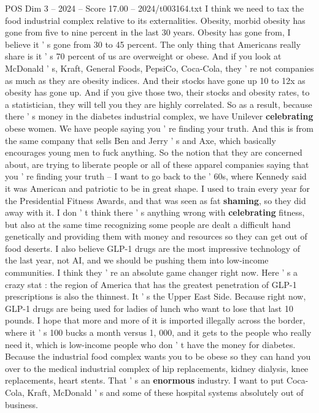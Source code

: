 \begin{textsample}{POS Dim 3 – 2024 – Score 17.00 – 2024/t003164.txt}
I think we need to tax the food industrial complex relative to its externalities.
Obesity, morbid obesity has gone from five to nine percent in the last 30 years.
Obesity has gone from, I believe it ' s gone from 30 to 45 percent.
The only thing that Americans really share is it ' s 70 percent of us are overweight or obese.
And if you look at McDonald ' s, Kraft, General Foods, PepsiCo, Coca-Cola, they ' re not companies as much as they are obesity indices.
And their stocks have gone up 10 to 12x as obesity has gone up.
And if you give those two, their stocks and obesity rates, to a statistician, they will tell you they are highly correlated.
So as a result, because there ' s money in the diabetes industrial complex, we have Unilever \textbf{celebrating} obese women.
We have people saying you ' re finding your truth.
And this is from the same company that sells Ben and Jerry ' s and Axe, which basically encourages young men to fuck anything.
So the notion that they are concerned about, are trying to liberate people or all of these apparel companies saying that you ' re finding your truth -- I want to go back to the ' 60s, where Kennedy said it was American and patriotic to be in great shape.
I used to train every year for the Presidential Fitness Awards, and that was seen as fat \textbf{shaming}, so they did away with it.
I don ' t think there ' s anything wrong with \textbf{celebrating} fitness, but also at the same time recognizing some people are dealt a difficult hand genetically and providing them with money and resources so they can get out of food deserts.
I also believe GLP-1 drugs are the most impressive technology of the last year, not AI, and we should be pushing them into low-income communities.
I think they ' re an absolute game changer right now.
Here ' s a crazy stat : the region of America that has the greatest penetration of GLP-1 prescriptions is also the thinnest.
It ' s the Upper East Side.
Because right now, GLP-1 drugs are being used for ladies of lunch who want to lose that last 10 pounds.
I hope that more and more of it is imported illegally across the border, where it ' s 100 bucks a month versus 1, 000, and it gets to the people who really need it, which is low-income people who don ' t have the money for diabetes.
Because the industrial food complex wants you to be obese so they can hand you over to the medical industrial complex of hip replacements, kidney dialysis, knee replacements, heart stents.
That ' s an \textbf{enormous} industry.
I want to put Coca-Cola, Kraft, McDonald ' s and some of these hospital systems absolutely out of business.

\end{textsample}
